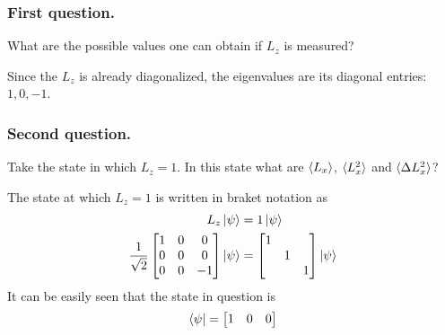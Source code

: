 \documentclass[../../../main.tex]{subfiles}
\begin{document}
\subsubsection{First question.}
What are the possible values one can obtain if $L_z$ is measured?

Since the $L_z$ is already diagonalized, the eigenvalues are its diagonal entries: $1,0,-1$.

\subsubsection{Second question.}
Take the state in which $L_z=1$.
In this state what are $\braket{L_x}$, $\braket{L_x^2}$ and $\braket{\Delta L_x^2}$?

The state at which $L_z=1$ is written in braket notation as
\begin{align*}
    L_z \ket{\psi} & =  1 \ket{\psi} \\
    \frac{1 }{\sqrt{2 }}\begin{bmatrix}
                            1 & 0 & 0  \\
                            0 & 0 & 0  \\
                            0 & 0 & -1 \\
                        \end{bmatrix}
    \ket{\psi}     & =
    \begin{bmatrix}
        1 &   &   \\
          & 1 &   \\
          &   & 1 \\
    \end{bmatrix}
    \ket{\psi}
\end{align*}
It can be easily seen that the state in question is
\begin{align*}
    \bra{\psi}=\begin{bmatrix}
                   1 & 0 & 0
               \end{bmatrix}
\end{align*}
\end{document}
